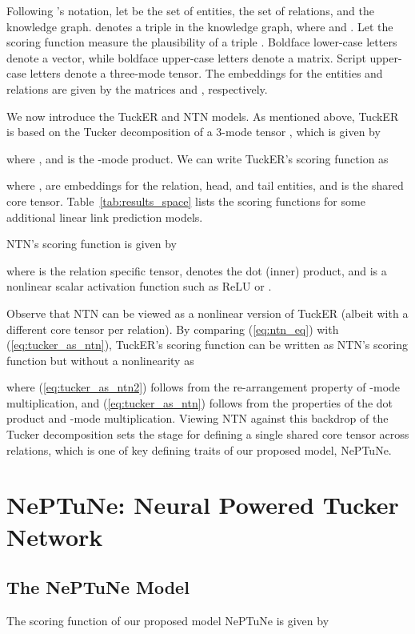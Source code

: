\documentclass[11pt]{article}
\begin{document}
Following \cite{balavzevic2019tucker}'s notation, let  be the set of entities,  the set of relations, and  the knowledge graph.  denotes a triple in the knowledge graph, where  and . Let the scoring function  measure the plausibility of a triple . Boldface lower-case letters  denote a vector, while boldface upper-case letters  denote a matrix. Script upper-case letters  denote a three-mode tensor. The embeddings for the entities and relations are given by the matrices  and , respectively.

We now introduce the TuckER and NTN models. 
As mentioned above, TuckER is based on the Tucker decomposition of a 3-mode tensor , which is given by

where , and  is the -mode product. 
We can write TuckER's scoring function as

where ,  are embeddings for the relation, head, and tail entities, and  is the shared core tensor. Table~\ref{tab:results_space} lists the scoring functions for some additional linear link prediction models.

NTN's scoring function is given by

where  is the relation specific tensor,  denotes the dot (inner) product, and  is a nonlinear scalar activation function such as ReLU or .

Observe that NTN can be viewed as a nonlinear version of TuckER (albeit with a different core tensor per relation). 
By comparing (\ref{eq:ntn_eq}) with (\ref{eq:tucker_as_ntn}), TuckER's scoring function can be written as NTN's scoring function but without a nonlinearity as

where (\ref{eq:tucker_as_ntn2}) follows from the re-arrangement property of -mode multiplication, and (\ref{eq:tucker_as_ntn}) follows from the properties of the dot product and -mode multiplication. 
Viewing NTN against this backdrop of the Tucker decomposition sets the stage for defining a single shared core tensor  across relations, which is one of key defining traits of our proposed model, NePTuNe.

\section{NePTuNe: Neural Powered Tucker Network}

\subsection{The NePTuNe Model}

The scoring function of our proposed model NePTuNe is given by
\end{document}
